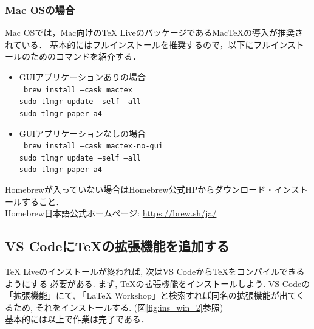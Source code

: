 \subsubsection{Mac OSの場合}
Mac OSでは，Mac向けのTeX LiveのパッケージであるMacTeXの導入が推奨されている．
基本的にはフルインストールを推奨するので，以下にフルインストールのためのコマンドを紹介する．
\begin{itemize}
  \item GUIアプリケーションありの場合\\
        \noindent
        \texttt{
          brew install --cask mactex\\
          sudo tlmgr update --self --all\\
          sudo tlmgr paper a4
        }
  \item GUIアプリケーションなしの場合\\
        \texttt{
          brew install --cask mactex-no-gui\\
          sudo tlmgr update --self --all\\
          sudo tlmgr paper a4
        }
\end{itemize}
Homebrewが入っていない場合はHomebrew公式HPからダウンロード・インストールすること．\\
Homebrew日本語公式ホームページ: \url{https://brew.sh/ja/}

\subsection{VS CodeにTeXの拡張機能を追加する}
TeX Liveのインストールが終われば, 次はVS Codeから\TeX をコンパイルできるようにする
必要がある. まず, \TeX の拡張機能をインストールしよう. VS Codeの「拡張機能」にて,
「LaTeX Workshop」と検索すれば同名の拡張機能が出てくるため, それをインストールする.
(図\ref{fig:ins_win_2}参照)\\

基本的には以上で作業は完了である．